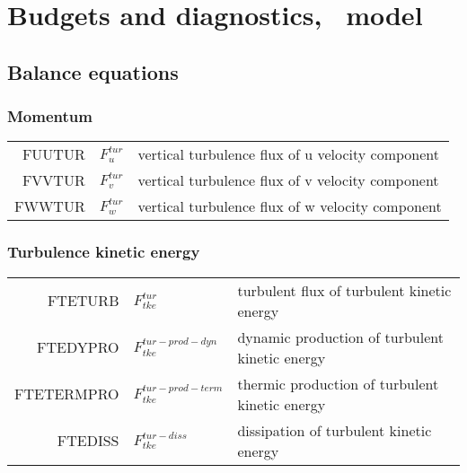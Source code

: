 \chapter{Budgets and diagnostics, \arome\ model}

\section{Balance equations}

\subsection{Momentum}

  \begin{tabular}{r l l}

       FUUTUR       &$F_{u}^{tur}$      &vertical turbulence flux of u velocity component\\
       FVVTUR       &$F_{v}^{tur}$  &vertical turbulence flux of v velocity component\\
       FWWTUR       &$F_{w}^{tur}$      &vertical turbulence flux of w velocity component\\

  \end{tabular}

  \subsection{Turbulence kinetic energy}
  \begin{tabular}{rll}

       FTETURB      &$F_{tke}^{tur}$   &turbulent flux of turbulent kinetic energy\\
       FTEDYPRO     &$F_{tke}^{tur-prod-dyn}$ &dynamic production of turbulent kinetic energy\\
       FTETERMPRO   &$F_{tke}^{tur-prod-term}$ &thermic production of turbulent kinetic energy \\
       FTEDISS      &$F_{tke}^{tur-diss}$ &dissipation of turbulent kinetic energy\\
  \end{tabular}

